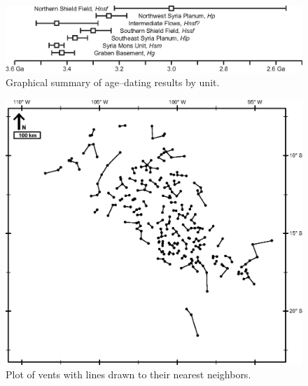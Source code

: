 \begin{figure}
\noindent\includegraphics{figures/fig2.eps}
\caption{Graphical summary of age--dating results by unit.}
\label{fig-unitages}
\end{figure}

\begin{figure}
\noindent\includegraphics{figures/fig3.eps}
\caption{Plot of vents with lines drawn to their nearest neighbors.}
\label{fig-nnmap}
\end{figure}

